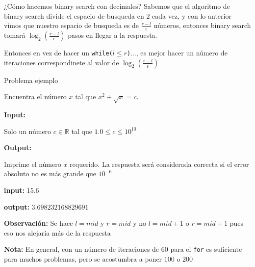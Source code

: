 \begin{frame}{¿Cómo hacemos binary search con decimales?}
	Sabemos que el algoritmo de binary search divide el espacio de busqueda en $2$ cada vez, y con lo anterior vimos que nuestro espacio de busqueda es de $\frac{r-l}{\epsilon}$ números, entonces binary search tomará $\log_2(\frac{r-l}{\epsilon})$ pasos en llegar a la respuesta.

	\vspace{0.5cm}

	Entonces en vez de hacer un \texttt{while($l \leq r$){$\dots$}}, es mejor hacer un número de iteraciones correspondinete al valor de \(\log_2({\frac{r-l}{\epsilon}})\)
\end{frame}


\begin{frame}{Problema ejemplo}
	\begin{ExampleP}[title=Equation]
		Encuentra el número $x$ tal que $x^{2} + \sqrt{x} = c$.

		\textbf{Input:}

		Solo un número $c \in \mathbb{R}$ tal que $1.0 \leq c \leq 10^{10}$

		\textbf{Output: }

		Imprime el número $x$ requerido. La respuesta será considerada correcta si el error absoluto no es más grande que $10^{-6}$
	\end{ExampleP}

	\begin{ExampleP}
		\textbf{input: }
		$15.6$

		\textbf{output: }
		$3.698232168829691$
	\end{ExampleP}
\end{frame}


\begin{frame}

	\begin{TipP}

		\textbf{Observación: } Se hace $l = mid$ y $r = mid$ y no $l = mid \pm 1$ o $r = mid \pm 1$ pues eso nos alejaría más de la respuesta
	\end{TipP}

	\begin{TipP}
		\textbf{Nota: } En general, con un número de iteraciones de $60$ para el \texttt{for} es suficiente para muchos problemas, pero se acostumbra a poner $100$ o $200$
	\end{TipP}
\end{frame}
